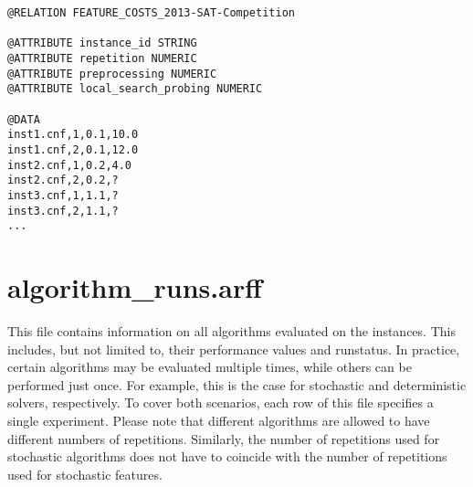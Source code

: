 \documentclass[]{elsarticle}
\begin{document}
\begin{lstlisting}[caption=Example feature\_costs.arff]
@RELATION FEATURE_COSTS_2013-SAT-Competition

@ATTRIBUTE instance_id STRING
@ATTRIBUTE repetition NUMERIC
@ATTRIBUTE preprocessing NUMERIC
@ATTRIBUTE local_search_probing NUMERIC

@DATA
inst1.cnf,1,0.1,10.0
inst1.cnf,2,0.1,12.0
inst2.cnf,1,0.2,4.0
inst2.cnf,2,0.2,?
inst3.cnf,1,1.1,?
inst3.cnf,2,1.1,?
...
\end{lstlisting}


\section{algorithm\_runs.arff}

This file contains information on all algorithms evaluated on the instances. This includes, but not limited to,
their performance values and runstatus. In practice, certain algorithms may be evaluated multiple times,
while others can be performed just once. For example, this is the case for stochastic and deterministic 
solvers, respectively. To cover both scenarios, each row of this file specifies a single experiment. Please 
note that different algorithms are allowed to have different numbers of repetitions. Similarly, the number of 
repetitions used for stochastic algorithms does not have to coincide with the number of repetitions used
for stochastic features. 
\end{document}
